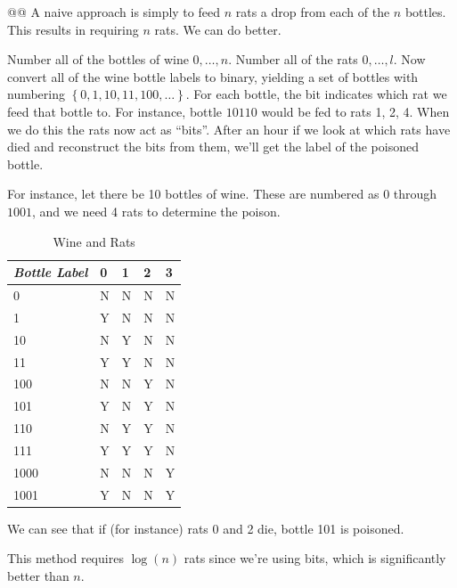 \documentclass[10pt]{article}\usepackage[]{graphicx}\usepackage[]{xcolor}
\begin{document}
\begin{easylist}[enumerate]
    @@ A naive approach is simply to feed $n$ rats a drop from each of the $n$ bottles. This results in requiring $n$
    rats. We can do better.\newline

    Number all of the bottles of wine $0, \ldots, n$. Number all of the rats $0, \ldots, l$. Now convert all of the wine
    bottle labels to binary, yielding a set of bottles with numbering $\left\{ 0, 1, 10, 11, 100, \ldots \right\}$. For
    each bottle, the bit indicates which rat we feed that bottle to. For instance, bottle $10110$ would be fed to rats
    1, 2, 4. When we do this the rats now act as ``bits''. After an hour if we look at which rats have died and
    reconstruct the bits from them, we'll get the label of the poisoned bottle.\newline

    For instance, let there be 10 bottles of wine. These are numbered as $0$ through $1001$, and we need 4 rats to
    determine the poison.

    \begin{table}[H]
        \centering
        \begin{tabular}{|l||l|l|l|l|}
            \hline
            \textit{Bottle Label} & 0 & 1 & 2 & 3\\
            \hline
            \hline
            0 & N & N & N & N\\
            1 & Y & N & N & N\\
            10 & N & Y & N & N\\
            11 & Y & Y & N & N\\
            100 & N & N & Y & N\\
            101 & Y & N & Y & N\\
            110 & N & Y & Y & N\\
            111 & Y & Y & Y & N\\
            1000 & N & N & N & Y\\
            1001 & Y & N & N & Y\\
            \hline
        \end{tabular}
        \caption{Wine and Rats}
    \end{table}

    We can see that if (for instance) rats 0 and 2 die, bottle 101 is poisoned.\newline

    This method requires $\log(n)$ rats since we're using bits, which is significantly better than $n$.
\end{easylist}
\end{document}
